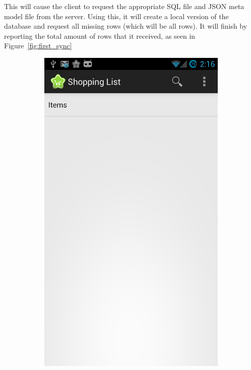 \documentclass[journal]{IEEEtran}
\begin{document}
This will cause the client to request the appropriate SQL file and JSON meta model file from the server. Using this, it will create a local version of the database and request all missing rows (which will be all rows). It will finish by reporting the total amount of rows that it received, as seen in Figure~\ref{fig:first_sync}


\begin{figure}[h!]
    \centering
    \begin{subfigure}[b]{0.1\textwidth}
        \centering
        \includegraphics[width=\textwidth]{images/s1.png}

\end{subfigure}
\end{figure}
\end{document}
